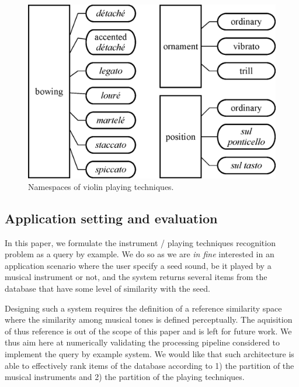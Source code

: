 \documentclass{article}
\begin{document}
\begin{figure}
\centering
\includegraphics[width=\linewidth]{./figs/dendrograms/technique-dendrogram.eps}
\caption{Namespaces of violin playing techniques.}
\label{fig:technique-dendrogram}
\end{figure}












\subsection{Application setting and evaluation}

\cite{maresz2013cmr}
\cite{lagrange2015jasa}


In this paper, we formulate the instrument / playing techniques recognition problem as a query by example.  We do so as we are \textit{in fine} interested in an application scenario where the user specify a seed sound, be it played by a musical instrument or not, and the system returns several items from the database that have some level of similarity with the seed.

Designing such a system requires the definition of a reference similarity space where the similarity among musical tones is defined perceptually. The aquisition of thus reference is out of the scope of this paper and is left for future work. We thus aim here at numerically validating the processing pipeline considered to implement the query by example system. We would like that such architecture is able to effectively rank items of the database according to 1) the  partition of the musical instruments and 2) the partition of the playing techniques.
\end{document}
